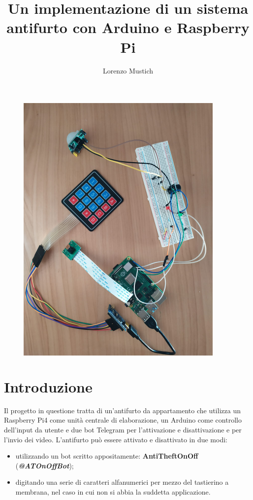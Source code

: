 \documentclass[12pt]{article}
\title{Un implementazione di un sistema antifurto con Arduino e Raspberry Pi}
\author{Lorenzo Mustich}
\begin{document}
	\maketitle
	
	\vfill
	\begin{figure}[h]
		\centering
		\includegraphics[width=4.0in]{prototipo}
	\end{figure}
	\vfill


	\newpage
	\tableofcontents
	\newpage

	\section{Introduzione}
	Il progetto in questione tratta di un'antifurto da appartamento che utilizza un Raspberry Pi4 
	come unità centrale di elaborazione, un Arduino come controllo dell'input da utente e due bot 
	Telegram per l'attivazione e disattivazione e per l'invio dei video. 
	L'antifurto può essere attivato e disattivato in due modi: 
	\begin{itemize}
		\item utilizzando un bot scritto appositamente: \textbf{AntiTheftOnOff} 
		(\textbf{\textit{@ATOnOffBot}});
		\item digitando una serie di caratteri 
		alfanumerici per mezzo del tastierino a membrana, nel caso in cui non si abbia la suddetta applicazione.
	\end{itemize}
\end{document}
